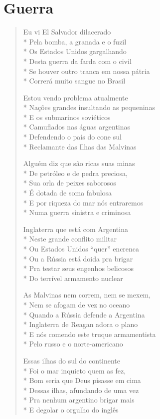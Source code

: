 \chapter{Guerra}

\begin{verse}
Eu vi El Salvador dilacerado\\*
Pela bomba, a granada e o fuzil\\*
Os Estados Unidos gargalhando\\*
Desta guerra da farda com o civil\\*
Se houver outro tranca em nossa pátria\\*
Correrá muito sangue no Brasil

Estou vendo problema atualmente\\*
Nações grandes insultando as pequeninas\\*
E os submarinos soviéticos\\*
Camuflados nas águas argentinas\\*
Defendendo o país do cone sul\\*
Reclamante das Ilhas das Malvinas

Alguém diz que são ricas suas minas\\*
De petróleo e de pedra preciosa,\\*
Sua orla de peixes saborosos\\*
É dotada de soma fabulosa\\*
E por riqueza do mar nós entraremos\\*
Numa guerra sinistra e criminosa

Inglaterra que está com Argentina\\*
Neste grande conflito militar\\*
Ou Estados Unidos “quer” encrenca\\*
Ou a Rússia está doida pra brigar\\*
Pra testar seus engenhos belicosos\\*
Do terrível armamento nuclear

As Malvinas nem correm, nem se mexem,\\*
Nem se afogam de vez no oceano\\*
Quando a Rússia defende a Argentina\\*
Inglaterra de Reagan adora o plano\\*
E nós comendo este truque armamentista\\*
Pelo russo e o norte-americano

Essas ilhas do sul do continente\\*
Foi o mar inquieto quem as fez,\\*
Bom seria que Deus pisasse em cima\\*
Dessas ilhas, afundando de uma vez\\*
Pra nenhum argentino brigar mais\\*
E degolar o orgulho do inglês


\end{verse}
